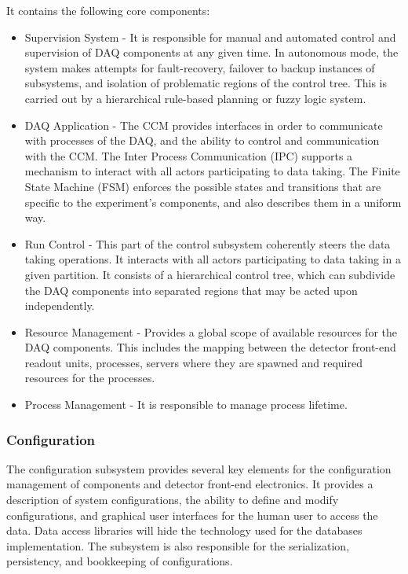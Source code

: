 It contains the following core components:
\begin{itemize}
\item Supervision System - It is responsible for manual and automated control and supervision of DAQ components at any given time. In autonomous mode, the system makes attempts for fault-recovery, failover to backup instances of subsystems, and isolation of problematic regions of the control tree. This is carried out by a hierarchical rule-based planning or fuzzy logic system.
\item DAQ Application - The CCM provides interfaces in order to communicate with processes of the DAQ, and the ability to control and communication with the CCM. The Inter Process Communication (IPC) supports a mechanism to interact with all actors participating to data taking. The Finite State Machine (FSM) enforces the possible states and transitions that are specific to the experiment’s components, and also describes them in a uniform way.
\item Run Control - This part of the control subsystem coherently steers the data taking operations. It interacts with all actors participating to data taking in a given partition. It consists of a hierarchical control tree, which can subdivide the DAQ components into separated regions that may be acted upon independently.
\item Resource Management - Provides a global scope of available resources for the DAQ components. This includes the mapping between the detector front-end readout units, processes, servers where they are spawned and required resources for the processes.
\item Process Management - It is responsible to manage process lifetime.
\end{itemize}

\subsubsection{Configuration}
\label{sec:daq:design:ccm:configuration}

The configuration subsystem provides several key elements for the configuration management of  components and detector front-end electronics. It provides a description of system configurations, the ability to define and modify configurations, and graphical user interfaces for the human user to access the data. Data access libraries will hide the technology used for the databases implementation. The subsystem is also responsible for the serialization, persistency, and bookkeeping of configurations. 

